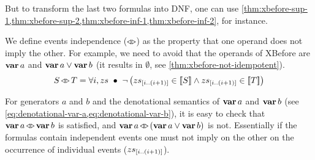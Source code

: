 \begin{sloppypar}
But to transform the last two formulas into \ac{DNF}, one can use \cref{thm:xbefore-sup-1,thm:xbefore-sup-2,thm:xbefore-inf-1,thm:xbefore-inf-2}, for instance.
\end{sloppypar}

We define events independence ($\operatorname{\triangleleft\triangleright}$) as the property that one operand does not imply the other.
For example, we need to avoid that the operands of \ac{XBefore} are $\operatorname{\mathbf{var}} a$ and $\operatorname{\mathbf{var}} a \lor \operatorname{\mathbf{var}} b$ (it results in $\emptyset$, see \cref{thm:xbefore-not-idempotent}).
%
\begin{equation}
\label{law:independent-events}
S \operatorname{\triangleleft\triangleright} T = \forall i, zs ~\bullet~
  \lnot \left(
    zs_{\left[i..\left(i+1\right)\right]} \in \left[\!\left[S\right]\!\right] \land
    zs_{\left[i..\left(i+1\right)\right]} \in \left[\!\left[T\right]\!\right]
  \right)
\end{equation}

\begin{sloppypar}
For generators $a$ and $b$ and the denotational semantics of $\operatorname{\mathbf{var}} a$ and $\operatorname{\mathbf{var}} b$ (see \cref{eq:denotational-var-a,eq:denotational-var-b}), it is easy to check that $\operatorname{\mathbf{var}} a \operatorname{\triangleleft\triangleright} \operatorname{\mathbf{var}} b$ is satisfied, and $\operatorname{\mathbf{var}} a \operatorname{\triangleleft\triangleright} \left(\operatorname{\mathbf{var}} a \lor \operatorname{\mathbf{var}} b\right)$ is not.
Essentially if the formulas contain independent events one must not imply on the other on the occurrence of individual events ($zs_{\left[i..\left(i+1\right)\right]}$).
\end{sloppypar}


